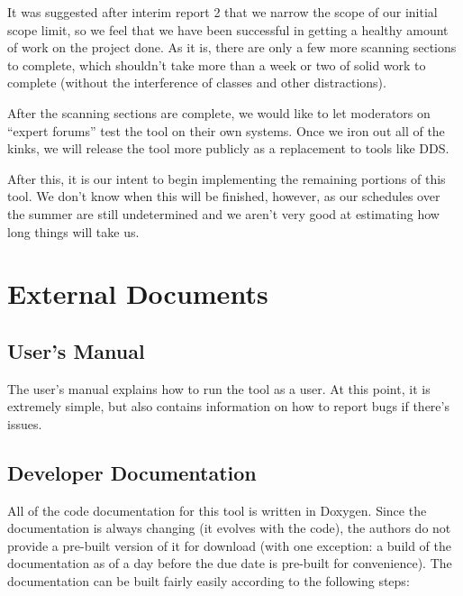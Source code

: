 \documentclass[letterpaper,12pt]{article}
\begin{document}
It was suggested after interim report 2 that we narrow the scope of our initial
scope limit, so we feel that we have been successful in getting a healthy amount
of work on the project done.  As it is, there are only a few more scanning
sections to complete, which shouldn't take more than a week or two of solid work
to complete (without the interference of classes and other distractions).  

After the scanning sections are complete, we would like to let moderators on
``expert forums'' test the tool on their own systems.  Once we iron out all of
the kinks, we will release the tool more publicly as a replacement to tools
like DDS.  

After this, it is our intent to begin implementing the remaining portions of
this tool.  We don't know when this will be finished, however, as our schedules
over the summer are still undetermined and we aren't very good at estimating how
long things will take us.  

\newpage



\section{External Documents} \label{documents}
\subsection{User's Manual}
The user's manual \cite{Manual} explains how to run the tool as a user.  At this
point, it is extremely simple, but also contains information on how to report
bugs if there's issues.  

\subsection{Developer Documentation}
All of the code documentation for this tool is written in Doxygen.  Since the
documentation is always changing (it evolves with the code), the authors do not
provide a pre-built version of it for download (with one exception: a build of
the documentation as of a day before the due date is pre-built for convenience).
The documentation can be built fairly easily according to the following steps:
\end{document}
